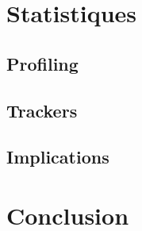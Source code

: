 \section{Statistiques}

	\subsection{Profiling}



	\subsection{Trackers}

	\subsection{Implications}

\section{Conclusion}